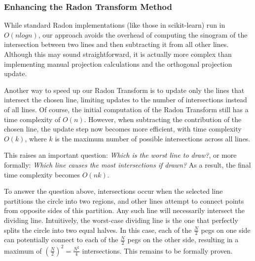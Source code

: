\subsubsection{Enhancing the Radon Transform Method}
\label{sec:radon_improvements}

While standard Radon implementations (like those in scikit-learn) run in \(O(nlogn)\), our approach avoids the overhead of computing the sinogram of the intersection between two lines and then subtracting it from all other lines. Although this may sound straightforward, it is actually more complex than implementing manual projection calculations and the orthogonal projection update.

Another way to speed up our Radon Transform is to update only the lines that intersect the chosen line, limiting updates to the number of intersections instead of all lines. Of course, the initial computation of the Radon Transform still has a time complexity of \(O(n)\). However, when subtracting the contribution of the chosen line, the update step now becomes more efficient, with time complexity \(O(k)\), where \(k\) is the maximum number of possible intersections across all lines. 

This raises an important question: \textit{Which is the worst line to draw?}, or more formally: \textit{Which line causes the most intersections if drawn?} As a result, the final time complexity becomes \(O(nk)\).

To answer the question above, intersections occur when the selected line partitions the circle into two regions, and other lines attempt to connect points from opposite sides of this partition. Any such line will necessarily intersect the dividing line. Intuitively, the worst-case dividing line is the one that perfectly splits the circle into two equal halves. In this case, each of the \(\frac{N}{2}\) pegs on one side can potentially connect to each of the \(\frac{N}{2}\) pegs on the other side, resulting in a maximum of \((\frac{N}{2})^2 = \frac{N^2}{4}\) intersections. This remains to be formally proven.